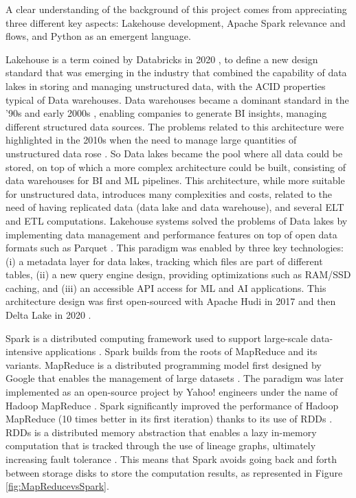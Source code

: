 A clear understanding of the background of this project comes from appreciating three different key aspects: Lakehouse development, Apache Spark relevance and flows, and Python as an emergent language.

Lakehouse is a term coined by Databricks in 2020 \cite{WhatLakehouse2020}, to define a new design standard that was emerging in the industry that combined the capability of data lakes in storing and managing unstructured data, with the \gls{ACID} properties typical of Data warehouses.
Data warehouses became a dominant standard in the '90s and early 2000s \cite{chaudhuriOverviewDataWarehousing1997}, enabling companies to generate \gls{BI} insights, managing different structured data sources. The problems related to this architecture were highlighted in the 2010s when the need to manage large quantities of unstructured data rose \cite{ederUnstructuredData802008}. 
So Data lakes became the pool where all data could be stored, on top of which a more complex architecture could be built, consisting of data warehouses for \gls{BI} and \gls{ML} pipelines.
This architecture, while more suitable for unstructured data, introduces many complexities and costs, related to the need of having replicated data (data lake and data warehouse), and several \gls{ELT} and \gls{ETL} computations.
Lakehouse systems solved the problems of Data lakes by implementing data management and performance features on top of open data formats such as Parquet \cite{DremelMadeSimple}. This paradigm was enabled by three key technologies: (i) a metadata layer for data lakes, tracking which files are part of different tables, (ii) a new query engine design, providing optimizations such as RAM/SSD caching, and (iii) an accessible \gls{API} access for \gls{ML} and \gls{AI} applications. This architecture design was first open-sourced with Apache Hudi in 2017 \cite{rajaperumalUberEngineeringIncremental2017} and then Delta Lake in 2020 \cite{armbrustDeltaLakeHighperformance2020}.

Spark is a distributed computing framework used to support large-scale data-intensive applications \cite{zaharia2010spark}. Spark builds from the roots of MapReduce and its variants. MapReduce is a distributed programming model first designed by Google that enables the management of large datasets \cite{dean2004mapreduce}. The paradigm was later implemented as an open-source project by Yahoo! engineers under the name of Hadoop MapReduce \cite{white2009hadoopMapReduce}. Spark significantly improved the performance of Hadoop MapReduce (10 times better in its first iteration) \cite{zaharia2010spark} thanks to its use of \glspl{RDD} \cite{Zaharia:EECS-2011-82}. \glspl{RDD} is a distributed memory abstraction that enables a lazy in-memory computation that is tracked through the use of lineage graphs, ultimately increasing fault tolerance \cite{Zaharia:EECS-2011-82}. This means that Spark avoids going back and forth between storage disks to store the computation results, as represented in Figure \ref{fig:MapReducevsSpark}.

